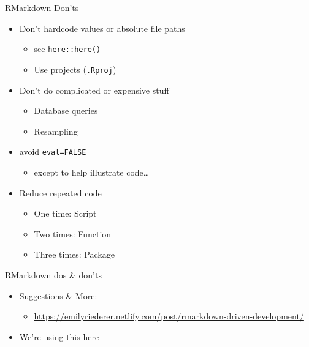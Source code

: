 \documentclass[ignorenonframetext,]{beamer}
\providecommand{\tightlist}{%
  \setlength{\itemsep}{0pt}\setlength{\parskip}{0pt}}
\begin{document}
\begin{frame}[fragile]{RMarkdown Don'ts}
\protect\hypertarget{rmarkdown-donts}{}

\begin{itemize}
\tightlist
\item
  Don't hardcode values or absolute file paths

  \begin{itemize}
  \tightlist
  \item
    see \texttt{here::here()}
  \item
    Use projects (\texttt{.Rproj})
  \end{itemize}
\item
  Don't do complicated or expensive stuff

  \begin{itemize}
  \tightlist
  \item
    Database queries
  \item
    Resampling
  \end{itemize}
\item
  avoid \texttt{eval=FALSE}

  \begin{itemize}
  \tightlist
  \item
    except to help illustrate code\ldots{}
  \end{itemize}
\item
  Reduce repeated code

  \begin{itemize}
  \tightlist
  \item
    One time: Script
  \item
    Two times: Function
  \item
    Three times: Package
  \end{itemize}
\end{itemize}

\end{frame}

\begin{frame}{RMarkdown dos \& don'ts}
\protect\hypertarget{rmarkdown-dos-donts}{}

\begin{itemize}
\tightlist
\item
  Suggestions \& More:

  \begin{itemize}
  \tightlist
  \item
    \url{https://emilyriederer.netlify.com/post/rmarkdown-driven-development/}
  \end{itemize}
\item
  We're using this here
\end{itemize}

\end{frame}
\end{document}

